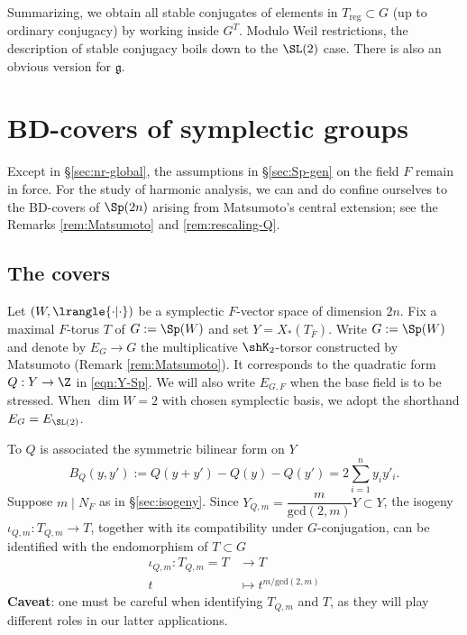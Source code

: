 \documentclass[a4paper,10pt]{article}
\begin{document}
Summarizing, we obtain all stable conjugates of elements in $T_\text{reg} \subset G$ (up to ordinary conjugacy) by working inside $G^T$. Modulo Weil restrictions, the description of stable conjugacy boils down to the $\SL(2)$ case. There is also an obvious version for $\mathfrak{g}$.

\section{BD-covers of symplectic groups}\label{sec:BD-covers-Sp}
Except in \S\ref{sec:nr-global}, the assumptions in \S\ref{sec:Sp-gen} on the field $F$ remain in force. For the study of harmonic analysis, we can and do confine ourselves to the BD-covers of $\Sp(2n)$ arising from Matsumoto's central extension; see the Remarks \ref{rem:Matsumoto} and \ref{rem:rescaling-Q}.

\subsection{The covers}\label{sec:BD-Sp}
Let $(W, \lrangle{\cdot | \cdot})$ be a symplectic $F$-vector space of dimension $2n$. Fix a maximal $F$-torus $T$ of $G := \Sp(W)$ and set $Y = X_*(T_{\bar{F}})$. Write $G := \Sp(W)$ and denote by $E_G \to G$ the multiplicative $\shK_2$-torsor constructed by Matsumoto (Remark \ref{rem:Matsumoto}). It corresponds to the quadratic form $Q: Y \to \Z$ in \eqref{eqn:Y-Sp}. We will also write $E_{G,F}$ when the base field is to be stressed. When $\dim W = 2$ with chosen symplectic basis, we adopt the shorthand $E_G = E_{\SL(2)}$.


To $Q$ is associated the symmetric bilinear form on $Y$
\[ B_Q(y, y') := Q(y+y')-Q(y)-Q(y') = 2 \sum_{i=1}^n y_i y'_i. \]
Suppose $m \mid N_F$ as in \S\ref{sec:isogeny}. Since $Y_{Q,m} = \dfrac{m}{\text{gcd}(2,m)} Y \subset Y$, the isogeny $\iota_{Q,m}: T_{Q,m} \to T$, together with its compatibility under $G$-conjugation, can be identified with the endomorphism of $T \subset G$
\begin{equation}\label{eqn:isogeny-Sp} \begin{aligned}
	\iota_{Q,m}: T_{Q,m} = T & \longrightarrow T \\
	t & \longmapsto t^{m/\text{gcd}(2,m)}
\end{aligned}\end{equation}
\textbf{Caveat}: one must be careful when identifying $T_{Q,m}$ and $T$, as they will play different roles in our latter applications.
\end{document}
